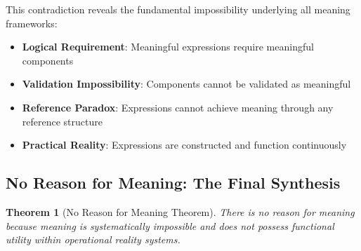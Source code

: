 \documentclass[12pt,a4paper]{article}
\newtheorem{theorem}{Theorem}[section]
\begin{document}
This contradiction reveals the fundamental impossibility underlying all meaning frameworks:

\begin{itemize}
\item \textbf{Logical Requirement}: Meaningful expressions require meaningful components
\item \textbf{Validation Impossibility}: Components cannot be validated as meaningful  
\item \textbf{Reference Paradox}: Expressions cannot achieve meaning through any reference structure
\item \textbf{Practical Reality}: Expressions are constructed and function continuously
\end{itemize}

\subsection{No Reason for Meaning: The Final Synthesis}

\begin{theorem}[No Reason for Meaning Theorem]
There is no reason for meaning because meaning is systematically impossible and does not possess functional utility within operational reality systems.
\end{theorem}
\end{document}
